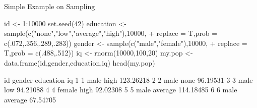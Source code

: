 \documentclass[11pt,german,hideothersubsections]{beamer}
\begin{document}
\begin{frame}[fragile]{Simple Example on Sampling}
\begin{footnotesize}
\begin{Schunk}
\begin{Sinput}
 id <- 1:10000
 set.seed(42)
 education <- sample(c("none","low","average","high"),10000, 
+                     replace = T,prob = c(.072,.356,.289,.283))
 gender <- sample(c("male","female"),10000,
+                  replace = T,prob = c(.488,.512))
 iq <- rnorm(10000,100,20)
 my.pop <- data.frame(id,gender,education,iq)
 head(my.pop)
\end{Sinput}
\begin{Soutput}
  id gender education        iq
1  1   male      high 123.26218
2  2   male      none  96.19531
3  3   male       low  94.21088
4  4 female      high  92.02308
5  5   male   average 114.18485
6  6   male   average  67.54705
\end{Soutput}
\end{Schunk}
\end{footnotesize}
\end{frame}
\end{document}
